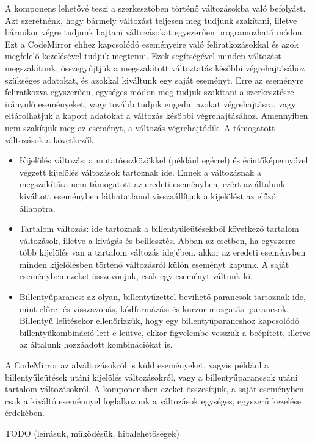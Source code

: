 \documentclass{elteikthesis}
\begin{document}
				A komponens lehetővé teszi a szerkesztőben történő változásokba való befolyást. Azt szeretnénk, hogy bármely változást teljesen meg tudjunk szakítani, illetve bármikor végre tudjunk hajtani változásokat egyszerűen programozható módon. Ezt a CodeMirror ehhez kapcsolódó eseményeire való feliratkozásokkal és azok megfelelő kezelésével tudjuk megtenni. Ezek segítségével minden változást megszakítunk, összegyűjtjük a megszakított változtatás későbbi végrehajtásához szükséges adatokat, és azokkal kiváltunk egy saját eseményt. Erre az eseményre feliratkozva egyszerűen, egységes módon meg tudjuk szakítani a szerkesztésre irányuló eseményeket, vagy tovább tudjuk engedni azokat végrehajtásra, vagy eltárolhatjuk a kapott adatokat a változás későbbi végrehajtásához. Amennyiben nem szakítjuk meg az eseményt, a változás végrehajtódik. A támogatott változások a következők:
				\begin{itemize}
					\item Kijelölés változás: a mutatóeszközökkel (például egérrel) és érintőképernyővel végzett kijelölés változások tartoznak ide. Ennek a változásnak a megszakítása nem támogatott az eredeti eseményben, ezért az általunk kiváltott eseményben láthatatlanul visszaállítjuk a kijelölést az előző állapotra. 
					\item Tartalom változás: ide tartoznak a billentyűleütésekből következő tartalom változások, illetve a kivágás és beillesztés. Abban az esetben, ha egyszerre több kijelölés van a tartalom változás idejében, akkor az eredeti eseményben minden kijelölésben történő változásról külön eseményt kapunk. A saját eseményben ezeket összevonjuk, csak egy eseményt váltunk ki. 
					\item Billentyűparancs: az olyan, billentyűzettel bevihető parancsok tartoznak ide, mint előre- és visszavonás, kódformázási és kurzor mozgatási parancsok. Billentyű leütésekor ellenőrizzük, hogy egy billentyűparancshoz kapcsolódó billentyűkombináció lett-e leütve, ekkor figyelembe vesszük a beépített, illetve az általunk hozzáadott kombinációkat is.
				\end{itemize}
				A CodeMirror az alváltozásokról is küld eseményeket, vagyis például a billentyűleütések utáni kijelölés változásokról, vagy a billentyűparancsok utáni tartalom változásokról. A komponensben ezeket összesítjük, a saját eseményben csak a kiváltó eseménnyel foglalkozunk a változások egységes, egyszerű kezelése érdekében.

			TODO (leírásuk, működésük, hibalehetőségek)
			
\end{document}
